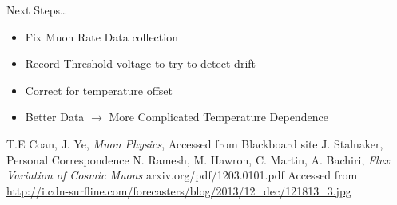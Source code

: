 \documentclass{beamer}
\begin{document}
\begin{frame}{Next Steps\dots{}}

\begin{itemize}
\item Fix Muon Rate Data collection
\item Record Threshold voltage to try to detect drift
\item Correct for temperature offset
\item Better Data $\to$ More Complicated Temperature Dependence
\end{itemize}


\end{frame}
\begin{frame}
\begin{thebibliography}{9}
	T.E Coan, J. Ye,
	\emph{Muon Physics},
	Accessed from Blackboard site
	J. Stalnaker, Personal Correspondence
	N. Ramesh, M. Hawron, C. Martin, A. Bachiri,
	\emph{Flux Variation of Cosmic Muons}
	arxiv.org/pdf/1203.0101.pdf
	Accessed from \url{http://i.cdn-surfline.com/forecasters/blog/2013/12_dec/121813_3.jpg}


\end{thebibliography}
\end{frame}
\end{document}
